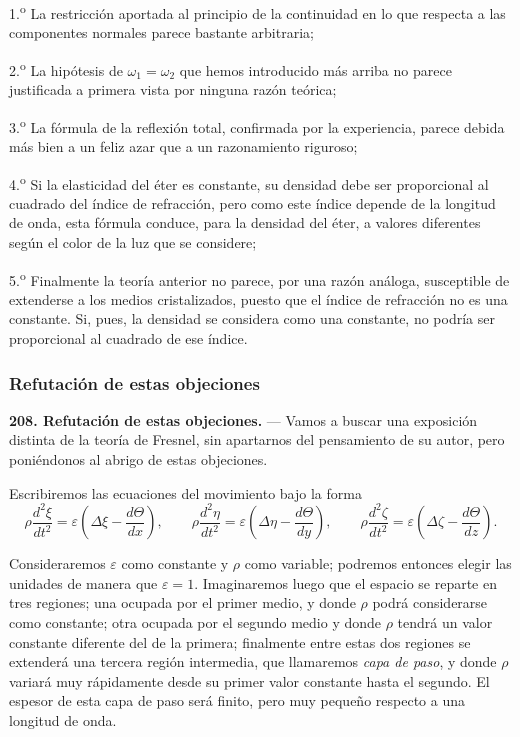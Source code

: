 1.\textsuperscript{o} La restricción aportada al principio de la continuidad en lo que
respecta a las componentes normales parece bastante arbitraria;

2.\textsuperscript{o} La hipótesis de $\omega_1=\omega_2$ que hemos introducido más
arriba no parece justificada a primera vista por ninguna razón teórica;

3.\textsuperscript{o} La fórmula de la reflexión total, confirmada por la experiencia,
parece debida más bien a un feliz azar que a un razonamiento riguroso;

4.\textsuperscript{o} Si la elasticidad del éter es constante, su densidad debe ser
proporcional al cuadrado del índice de refracción, pero como este índice
depende de la longitud de onda, esta fórmula conduce, para la densidad del
éter, a valores diferentes según el color de la luz que se considere;

5.\textsuperscript{o} Finalmente la teoría anterior no parece, por una razón análoga,
susceptible de extenderse a los medios cristalizados, puesto que el índice
de refracción no es una constante. Si, pues, la densidad se considera como
una constante, no podría ser proporcional al cuadrado de ese índice.

\subsubsection{Refutación de estas objeciones}

\noindent\textbf{208. Refutación de estas objeciones.} — Vamos a buscar
una exposición distinta de la teoría de Fresnel, sin apartarnos del
pensamiento de su autor, pero poniéndonos al abrigo de estas objeciones.

Escribiremos las ecuaciones del movimiento bajo la forma
\[
\rho\frac{d^2\xi}{dt^2}=\varepsilon\left(\Delta\xi-\frac{d\Theta}{dx}\right),
\qquad
\rho\frac{d^2\eta}{dt^2}=\varepsilon\left(\Delta\eta-\frac{d\Theta}{dy}\right),
\qquad
\rho\frac{d^2\zeta}{dt^2}=\varepsilon\left(\Delta\zeta-\frac{d\Theta}{dz}\right).
\]

Consideraremos $\varepsilon$ como constante y $\rho$ como variable;
podremos entonces elegir las unidades de manera que $\varepsilon=1$.
Imaginaremos luego que el espacio se reparte en tres regiones; una
ocupada por el primer medio, y donde $\rho$ podrá considerarse como
constante; otra ocupada por el segundo medio y donde $\rho$ tendrá un
valor constante diferente del de la primera; finalmente entre estas dos
regiones se extenderá una tercera región intermedia, que llamaremos
\emph{capa de paso}, y donde $\rho$ variará muy rápidamente desde su
primer valor constante hasta el segundo. El espesor de esta capa de paso
será finito, pero muy pequeño respecto a una longitud de onda.

